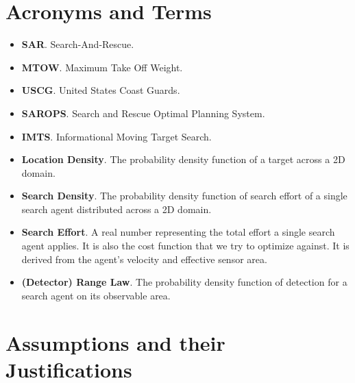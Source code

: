 \documentclass[12pt, letterpaper]{article}  %
\theoremstyle{definition}
\theoremstyle{remark}
\theoremstyle{plain}
\begin{document}
\section{Acronyms and Terms}\label{sec:terms}

\begin{itemize}
\item \textbf{SAR}. Search-And-Rescue.

\item \textbf{MTOW}. Maximum Take Off Weight.

\item \textbf{USCG}. United States Coast Guards.
\item \textbf{SAROPS}. Search and Rescue Optimal Planning System.
\item \textbf{IMTS}. Informational Moving Target Search.

\item \textbf{Location Density}. The probability density function of a target across a 2D domain.

\item \textbf{Search Density}. The probability density function of search effort of a single search agent distributed across a 2D domain.

\item \textbf{Search Effort}. A real number representing the total effort a single search agent applies. It is also the cost function that we try to optimize against. It is derived from the 
agent's velocity and effective sensor area.

\item \textbf{(Detector) Range Law}. The probability density function of detection for a search agent on its observable area.

\end{itemize}


\section{Assumptions and their Justifications}\label{sec:assumptions}
\end{document}

